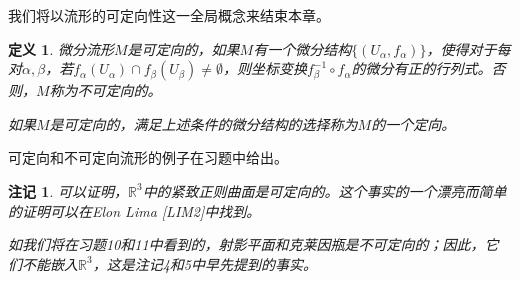 \documentclass[12pt,a4paper]{ctexbook}
\newtheorem{definition}[theorem]{定义}
\newtheorem{remark}[theorem]{注记}
\begin{document}
我们将以流形的可定向性这一全局概念来结束本章。

\begin{definition}
微分流形$M$是可定向的，如果$M$有一个微分结构$\{(U_\alpha,f_\alpha)\}$，使得对于每对$\alpha,\beta$，若$f_\alpha(U_\alpha)\cap f_\beta(U_\beta)\neq\emptyset$，则坐标变换$f_\beta^{-1}\circ f_\alpha$的微分有正的行列式。否则，$M$称为不可定向的。

如果$M$是可定向的，满足上述条件的微分结构的选择称为$M$的一个定向。
\end{definition}

可定向和不可定向流形的例子在习题中给出。

\begin{remark}
可以证明，$\mathbb{R}^3$中的紧致正则曲面是可定向的。这个事实的一个漂亮而简单的证明可以在Elon Lima [LIM2]中找到。

如我们将在习题10和11中看到的，射影平面和克莱因瓶是不可定向的；因此，它们不能嵌入$\mathbb{R}^3$，这是注记4和5中早先提到的事实。
\end{remark}
\end{document}
